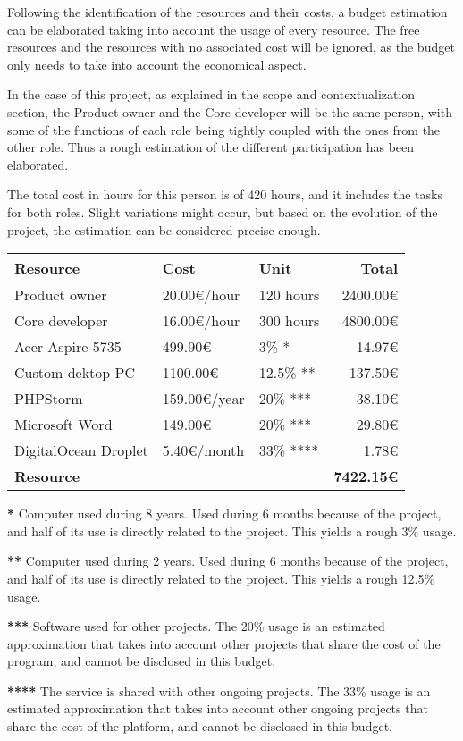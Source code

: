 Following the identification of the resources and their costs, a budget estimation can be elaborated taking into account the usage of every resource. The free resources and the resources with no associated cost will be ignored, as the budget only needs to take into account the economical aspect.

In the case of this project, as explained in the scope and contextualization section, the Product owner and the Core developer will be the same person, with some of the functions of each role being tightly coupled with the ones from the other role. Thus a rough estimation of the different participation has been elaborated.

The total cost in hours for this person is of 420 hours, and it includes the tasks for both roles. Slight variations might occur, but based on the evolution of the project, the estimation can be considered precise enough.
\hfill\break
\begin{center}
    \begin{tabular}{ | l | l | l | r |}
    	\hline
 		\textbf{Resource} & \textbf{Cost} & \textbf{Unit} & \textbf{Total} \\ \hline
 		Product owner & 20.00\euro{}/hour & 120 hours & 2400.00\euro{} \\ \hline
 		Core developer & 16.00\euro{}/hour & 300 hours & 4800.00\euro{} \\ \hline
 		Acer Aspire 5735 & 499.90\euro{} & 3\% * & 14.97\euro{} \\ \hline
 		Custom dektop PC & 1100.00\euro{} & 12.5\% ** & 137.50\euro{} \\ \hline
 		PHPStorm & 159.00\euro{}/year & 20\% *** & 38.10\euro{} \\ \hline
 		Microsoft Word & 149.00\euro{} & 20\% *** & 29.80\euro{} \\ \hline
 		DigitalOcean Droplet & 5.40\euro{}/month & 33\% **** & 1.78\euro{} \\ \hline
 		\textbf{Resource} &  &  & \textbf{7422.15\euro{}} \\ \hline
    \end{tabular}
\end{center}
\hfill\break
{\tiny \textbf{*} Computer used during 8 years. Used during 6 months because of the project, and half of its use is directly related to the project. This yields a rough 3\% usage.}

{\tiny \textbf{**} Computer used during 2 years. Used during 6 months because of the project, and half of its use is directly related to the project. This yields a rough 12.5\% usage.}

{\tiny \textbf{***} Software used for other projects. The 20\% usage is an estimated approximation that takes into account other projects that share the cost of the program, and cannot be disclosed in this budget.}

{\tiny \textbf{****} The service is shared with other ongoing projects. The 33\% usage is an estimated approximation that takes into account other ongoing projects that share the cost of the platform, and cannot be disclosed in this budget.}